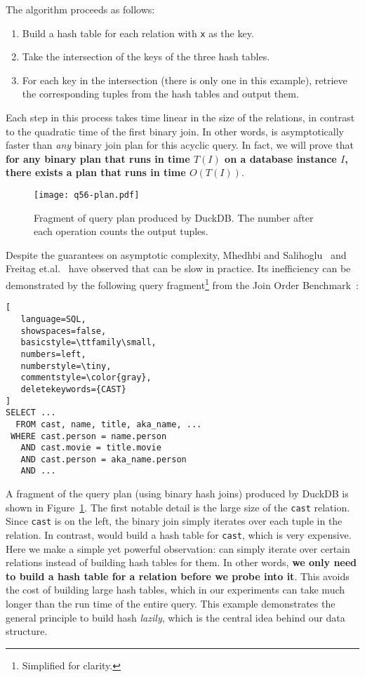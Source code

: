 The algorithm proceeds as follows:
\begin{enumerate}
  \item Build a hash table for each relation with \texttt{x} as the key.
  \item Take the intersection of the keys of the three hash tables.
  \item For each key in the intersection (there is only one in this example),
  retrieve the corresponding tuples from the hash tables and output them.
\end{enumerate}
Each step in this process takes time linear in the size of the relations,
  in contrast to the quadratic time of the first binary join.
In other words, \GJ is asymptotically faster than \emph{any}
  binary join plan for this acyclic query.
In fact, we will prove that 
\textbf{for any binary plan that runs in time $T(I)$ 
  on a database instance $I$,
  there exists a \GJ plan that runs in time $O(T(I))$}.

\begin{figure}
  \centering
  \texttt{[image: q56-plan.pdf]}
  \caption{
    Fragment of query plan produced by DuckDB.
    The number after each operation counts the output tuples.
  }
  \label{fig:q56-plan}
\end{figure}

Despite the guarantees on asymptotic complexity,
  Mhedhbi and Salihoglu~\cite{} 
  and Freitag et.al.~\cite{} 
  have 
 observed that \GJ can be slow in practice.
Its inefficiency can be demonstrated by the following query fragment\footnote{Simplified for clarity.}
  from the Join Order Benchmark~\cite{DBLP:journals/pvldb/LeisGMBK015}:
%
 \begin{lstlisting}[
   language=SQL,
   showspaces=false,
   basicstyle=\ttfamily\small,
   numbers=left,
   numberstyle=\tiny,
   commentstyle=\color{gray},
   deletekeywords={CAST}
]
SELECT ...
  FROM cast, name, title, aka_name, ... 
 WHERE cast.person = name.person
   AND cast.movie = title.movie
   AND cast.person = aka_name.person
   AND ...
\end{lstlisting}
%
A fragment of the query plan (using binary hash joins) produced by DuckDB 
  is shown in Figure~\ref{fig:q56-plan}.
The first notable detail is the large size of the \texttt{cast} relation.
Since \texttt{cast} is on the left, 
  the binary join simply iterates over each tuple in the relation.
In contrast, \GJ would build a hash table for \texttt{cast},
  which is very expensive.
Here we make a simple yet powerful observation:
  \GJ can simply iterate over certain relations
  instead of building hash tables for them.
In other words, \textbf{we only need to build a hash table 
  for a relation before we probe into it}.
This avoids the cost of building large hash tables, 
  which in our experiments can take much longer 
  than the run time of the entire query.
This example demonstrates the general principle 
  to build hash \emph{lazily}, 
  which is the central idea behind our \COLT data structure.

